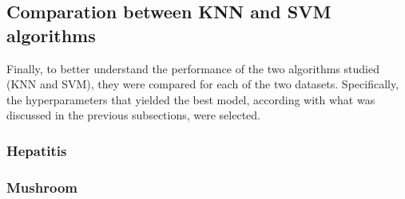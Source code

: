 \subsection{Comparation between KNN and SVM algorithms}
Finally, to better understand the performance of the two algorithms studied (KNN and SVM), they were compared for each of the two datasets. Specifically, the hyperparameters that yielded the best model, according with what was discussed in the previous subsections, were selected.
\subsubsection{Hepatitis}

\subsubsection{Mushroom}
